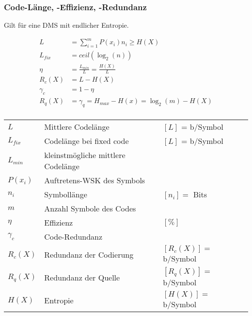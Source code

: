 \subsubsection{Code-Länge, -Effizienz, -Redundanz }
Gilt für eine DMS mit endlicher Entropie.
\begin{multicols}{2}
	\abovedisplayskip=-15pt %
	\begin{align*}
		L 		 &= \sum\limits_{i=1}^m P(x_i) n_i \geq H(X)\\
		L_{fix}	 &= ceil(\log_2(n))\\
		\eta	 & = \frac{L_{min}}{L} = \frac{H(X)}{L}  \\
		R_c(X) &  = L - H(X) \\
		\gamma_c &  = 1-\eta \\
		R_q(X)	 &= \gamma_q = H_{max} - H(x) = \log_2(m) - H(X) \\
	\end{align*}
	
	\begin{tabular}{lll}
		$L$ 		& Mittlere Codelänge & $[L]$ = b/Symbol \\
		$L_{fix}$	& Codelänge bei fixed code	& $[L]$ = b/Symbol \\
		$L_{min}$ 	& kleinstmögliche mittlere Codelänge &  \\
		$P(x_i)$	& Auftretens-WSK des Symbols \\
		$n_i$ 		& Symbollänge & $[n_i] = $ Bits \\
		$m$ 		& Anzahl Symbole des Codes \\
		$\eta$ 		& Effizienz & $[\%]$\\
		$\gamma_c$  & Code-Redundanz  & \\
		$R_c(X)$    & Redundanz der Codierung & $[R_c(X)] = $ b/Symbol\\
		$R_q(X)$    & Redundanz der Quelle & $[R_q(X)] = $ b/Symbol\\
		$H(X)$ 		& Entropie &  $[H(X)] = $ b/Symbol
	\end{tabular}
\end{multicols}

